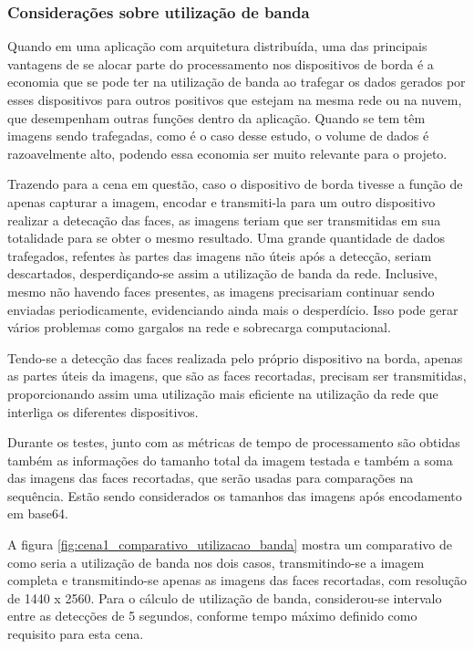 \subsubsection{Considerações sobre utilização de banda}

Quando em uma aplicação com arquitetura distribuída, uma das principais vantagens de se alocar parte do processamento nos dispositivos de borda é a economia que se pode ter na utilização de banda ao trafegar os dados gerados por esses dispositivos para outros positivos que estejam na mesma rede ou na nuvem, que desempenham outras funções dentro da aplicação. Quando se tem têm imagens sendo trafegadas, como é o caso desse estudo, o volume de dados é razoavelmente alto, podendo essa economia ser muito relevante para o projeto.

Trazendo para a cena em questão, caso o dispositivo de borda tivesse a função de apenas capturar a imagem, encodar e transmiti-la para um outro dispositivo realizar a detecação das faces, as imagens teriam que ser transmitidas em sua totalidade para se obter o mesmo resultado. Uma grande quantidade de dados trafegados, refentes às partes das imagens não úteis após a detecção, seriam descartados, desperdiçando-se assim a utilização de banda da rede. Inclusive, mesmo não havendo faces presentes, as imagens precisariam continuar sendo enviadas periodicamente, evidenciando ainda mais o desperdício. Isso pode gerar vários problemas como gargalos na rede e sobrecarga computacional.

Tendo-se a detecção das faces realizada pelo próprio dispositivo na borda, apenas as partes úteis da imagens, que são as faces recortadas, precisam ser transmitidas, proporcionando assim uma utilização mais eficiente na utilização da rede que interliga os diferentes dispositivos.

Durante os testes, junto com as métricas de tempo de processamento são obtidas também as informações do tamanho total da imagem testada e também a soma das imagens das faces recortadas, que serão usadas para comparações na sequência. Estão sendo considerados os tamanhos das imagens após encodamento em base64.

A figura \ref{fig:cena1_comparativo_utilizacao_banda} mostra um comparativo de como seria a utilização de banda nos dois casos, transmitindo-se a imagem completa e transmitindo-se apenas as imagens das faces recortadas, com resolução de 1440 x 2560. Para o cálculo de utilização de banda, considerou-se intervalo entre as detecções de 5 segundos, conforme tempo máximo definido como requisito para esta cena.


